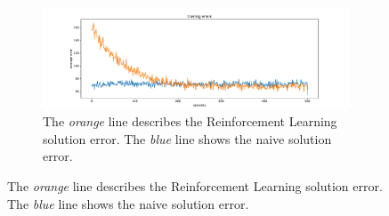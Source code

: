 \documentclass[conference]{IEEEtran}
\begin{document}
\begin{figure}
  \begin{subfigure}[b]{\textwidth}
    \centering
    \includegraphics[width=\textwidth]{img/mean-error}
    \caption{The \textit{orange} line 
    describes the Reinforcement Learning solution error. The \textit{blue} line shows
    the naive solution error.}
    \hspace{5mm}
  \end{subfigure}
  

\end{figure}
\end{document}
